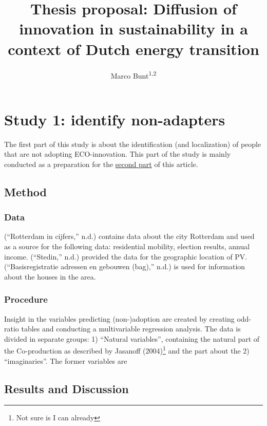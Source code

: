 \documentclass[english,man,doc,11pt, twoside,floatsintext]{apa6}
\title{Thesis proposal: Diffusion of innovation in sustainability in a context
of Dutch energy transition}
\author{Marco Bunt\textsuperscript{1,2}}
\date{}
\affiliation{
\vspace{0.5cm}
\textsuperscript{1} Erasmus school of social and behavioural sciences\\\textsuperscript{2} Stedin netbeheer}
\let\rmarkdownfootnote\footnote%
\def\footnote{\protect\rmarkdownfootnote}
\begin{document}
\maketitle

\section{\texorpdfstring{Study 1: identify non-adapters
\label{Study1}}{Study 1: identify non-adapters }}\label{study-1-identify-non-adapters}

The first part of this study is about the identification (and
localization) of people that are not adopting ECO-innovation. This part
of the study is mainly conducted as a preparation for the
\hyperref[Study2]{second part} of this article.

\subsection{Method}\label{method}

\subsubsection{Data}\label{data}

(``Rotterdam in cijfers,'' n.d.) contains data about the city Rotterdam
and used as a source for the following data: residential mobility,
election results, annual income. (``Stedin,'' n.d.) provided the data
for the geographic location of PV. (``Basisregistratie adressen en
gebouwen (bag),'' n.d.) is used for information about the houses in the
area.

\subsubsection{Procedure}\label{procedure}

Insight in the variables predicting (non-)adoption are created by
creating odd-ratio tables and conducting a multivariable regression
analysis. The data is divided in separate groups: 1) \enquote{Natural
variables}, containing the natural part of the Co-production as
described by Jasanoff (2004)\footnote{Not sure is I can already} and the
part about the 2) \enquote{imaginaries}. The former variables are

\subsection{Results and Discussion}\label{results-and-discussion}
\end{document}
